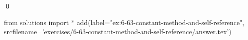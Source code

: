 
\begin{ex}
  \label{ex:6-63-constant-method-and-self-reference}
  
  \qed
\end{ex}
\begin{python0}
from solutions import *
add(label="ex:6-63-constant-method-and-self-reference",
    srcfilename='exercises/6-63-constant-method-and-self-reference/answer.tex')
\end{python0}
